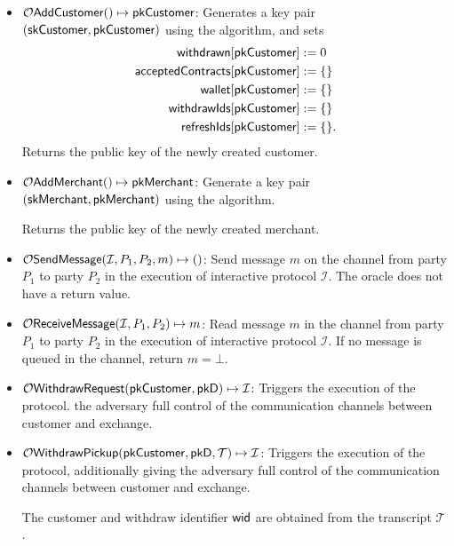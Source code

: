 \begin{itemize}
  \item $\mathcal{O}\mathsf{AddCustomer}() \mapsto \mathsf{pkCustomer}$:
    Generates a key pair $(\mathsf{skCustomer}, \mathsf{pkCustomer})$ using the
     algorithm, and sets
    \begin{align*}
      \mathsf{withdrawn}[\mathsf{pkCustomer}] &:= 0\\
      \mathsf{acceptedContracts}[\mathsf{pkCustomer}] &:= \{ \}\\
      \mathsf{wallet}[\mathsf{pkCustomer}] &:= \{\} \\
      \mathsf{withdrawIds}[\mathsf{pkCustomer}] &:= \{\} \\
      \mathsf{refreshIds}[\mathsf{pkCustomer}] &:= \{\}.
    \end{align*}
    Returns the public key of the newly created customer.

  \item $\mathcal{O}\mathsf{AddMerchant}() \mapsto \mathsf{pkMerchant}$:
    Generate a key pair $(\mathsf{skMerchant}, \mathsf{pkMerchant})$ using the
     algorithm.

    Returns the public key of the newly created merchant.

  \item $\mathcal{O}\mathsf{SendMessage}(\mathcal{I}, P_1, P_2, m) \mapsto ()$:
    Send message $m$ on the channel from party $P_1$ to party $P_2$ in the
    execution of interactive protocol $\mathcal{I}$.  The oracle does not have
    a return value.

  \item $\mathcal{O}\mathsf{ReceiveMessage}(\mathcal{I}, P_1, P_2) \mapsto m$:
    Read message $m$ in the channel from party $P_1$ to party $P_2$ in the execution
    of interactive protocol $\mathcal{I}$.  If no message is queued in the channel,
    return $m = \bot$.

  \item $\mathcal{O}\mathsf{WithdrawRequest}(\mathsf{pkCustomer}, \mathsf{pkD}) \mapsto \mathcal{I}$:
    Triggers the execution of the  protocol.  the
    adversary full control of the communication channels between customer and
    exchange.

  \item $\mathcal{O}\mathsf{WithdrawPickup}(\mathsf{pkCustomer}, \mathsf{pkD}, \mathcal{T}) \mapsto \mathcal{I}$:
    Triggers the execution of the  protocol, additionally giving
    the adversary full control of the communication channels between customer and exchange.

    The customer and withdraw identifier $\mathsf{wid}$ are obtained from the  transcript $\mathcal{T}$.


\end{itemize}
